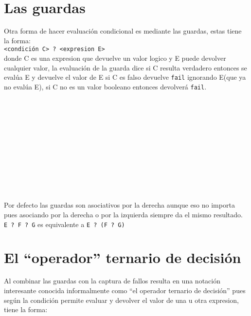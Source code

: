    \section{Las guardas}
      Otra forma de hacer evaluación condicional es mediante las guardas, estas tiene la forma:
      \\
      
      \texttt{<condición C>~? <expresion E>}
      \\
      
      donde C es una expresion que devuelve un valor logico y E puede devolver cualquier valor, la evaluación de la guarda dice si C resulta verdadero entonces se evalúa E y devuelve el valor de E si C es falso devuelve \texttt{fail} ignorando E(que ya no evalúa E), si C no es un valor booleano entonces devolverá \texttt{fail}.
      
      \begin{fxcode}
         \\
         \\
         \\
         \\
         \\
         \\
         \\
         \\
         \outcode{()}\\
          \\
      \end{fxcode}
      
      Por defecto las guardas son asociativos por la derecha aunque eso no importa pues asociando por la derecha o por la izquierda siempre da el mismo resultado.
      \\
      
      \texttt{E ? F ? G} es equivalente a \texttt{E ? (F ? G)}
      
   \section{El ``operador'' ternario de decisión}
      Al combinar las guardas con la captura de fallos resulta en una notación interesante conocida informalmente como ``el operador ternario de decisión'' pues según la condición permite evaluar y devolver el valor de una u otra expresion, tiene la forma:
      \\
      
